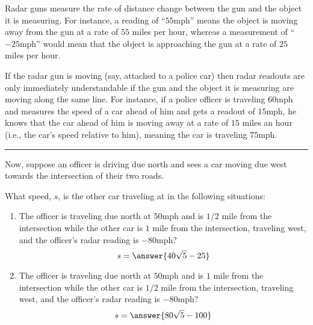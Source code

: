 \documentclass{ximera}
\author{Gregory Hartman \and Matthew Carr}
\begin{document}
\begin{exercise}




Radar guns measure the rate of distance change between the gun and the object it is measuring. For instance, a reading of ``$55$mph'' means the object is moving away from the gun at a rate of $55$ miles per hour, whereas a measurement of ``$-25$mph'' would mean that the object is approaching the gun at a rate of $25$ miles per hour.

If the radar gun is moving (say, attached to a police car) then radar readouts are only immediately understandable if the gun and the object it is measuring are moving along the same line. For instance, if a police officer is traveling $60$mph and measures the speed of a car ahead of him and gets a readout of $15$mph, he knows that the car ahead of him is moving away at a rate of $15$ miles an hour (i.e., the car's speed relative to him), meaning the car is traveling $75$mph.

\noindent\rule{12.25cm}{0.33pt}

Now, suppose an officer is driving due north and sees a car moving due west towards the intersection of their two roads.

What speed, $s$, is the other car traveling at in the following situations:
\begin{enumerate}
\item		The officer is traveling due north at $50$mph and is $1/2$ mile from the intersection while the other car is $1$ mile from the intersection, traveling west, and the officer's radar reading is $-80$mph? \[s = \answer{40\sqrt{5}-25}\]
\item		The officer is traveling due north at $50$mph and is $1$ mile from the intersection while the other car is $1/2$ mile from the intersection, traveling west, and the officer's radar reading is $-80$mph? \[s = \answer{80\sqrt{5}-100}\]
\end{enumerate}


\end{exercise}
\end{document}

